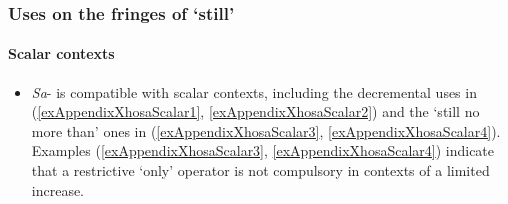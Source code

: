 \subsubsection{Uses on the fringes of \lq{}still\rq}
\paragraph{Scalar contexts}\largerpage
\label{appendixXhosaScalar}
\begin{itemize}
	\item \textit{Sa}- is compatible with scalar contexts, including the decremental uses in (\ref{exAppendixXhosaScalar1}, \ref{exAppendixXhosaScalar2}) and the \lq still no more than' ones in  (\ref{exAppendixXhosaScalar3}, \ref{exAppendixXhosaScalar4}). Examples (\ref{exAppendixXhosaScalar3}, \ref{exAppendixXhosaScalar4}) indicate that a restrictive \lq only\rq{ }operator is not compulsory in contexts of a limited increase.
\end{itemize}

